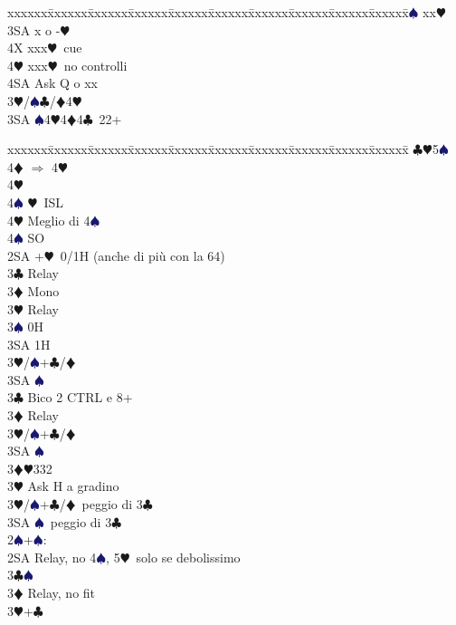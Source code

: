 \documentclass[a4paper,italian]{article}
\newcommand{\BC}{\textcolor{OliveGreen}{$\clubsuit$}}
\newcommand{\BD}{\textcolor{RedOrange}{$\vardiamondsuit$}}
\newcommand{\BH}{\textcolor{Red2}{$\varheartsuit${}}}
\newcommand{\BS}{\textcolor{MidnightBlue}{$\spadesuit${}}}
\newenvironment{bidtable}
{\begin{tabbing}

    xxxxxx\=xxxxxx\=xxxxxx\=xxxxxx\=xxxxxx\=xxxxxx\=xxxxxx\=xxxxxx\=xxxxxx\=xxxxxx\=\kill}
{\end{tabbing} }%
\begin{document}
\begin{multicols}{2}
\begin{bidtable}
        3\BS \> xx\BH \\
        3SA \> x o -\BH \\
        4X \> xxx\BH\ cue\\
        4\BH \> xxx\BH\ no controlli\+\\
        4SA \>Ask Q o xx\-\-\\
        3\BH/\BS {}\BC /\BD 4\BH \\
        3SA \BS 4\BH 4\BD 4\BC\ 22+\\
    \end{bidtable}
    \vfill\null
    \columnbreak
    \begin{bidtable}
        \>\>\BC {}\BH 5\BS \+\+\+\+\\
        4\BD \> $\Rightarrow$ 4\BH \+\\
        4\BH\+\\
        4\BS \> \BH\ ISL\-\-\\
        4\BH \> Meglio di 4\BS \\
        4\BS \> SO\-\-\\
        2SA +\BH\ 0/1H (anche di più con la 64)\+\\
        3\BC \> Relay\+\\
        3\BD \> Mono\+\\
        3\BH \> Relay\+\\
        3\BS \> 0H\\
        3SA \> 1H\-\-\\
        3\BH/\BS {}+\BC /\BD \\
        3SA \BS \-\-\\
        3\BC \> Bico 2 CTRL e 8+\+\\
        3\BD \> Relay\+\\
        3\BH/\BS {}+\BC /\BD \\
        3SA \BS \-\-\\
        3\BD {}\BH 332\+\\
        3\BH \> Ask H a gradino\-\\
        3\BH/\BS {}+\BC /\BD\ peggio di 3\BC \\
        3SA \BS\ peggio di 3\BC \-\\
        2\BS {}+\BS :\+\\
        2SA \> Relay, no 4\BS , 5\BH\ solo se debolissimo\+\\
        3\BC {}\BS \+\\
        3\BD \> Relay, no fit\+\\
        3\BH {}+\BC \\

\end{bidtable}
\end{multicols}
\end{document}

